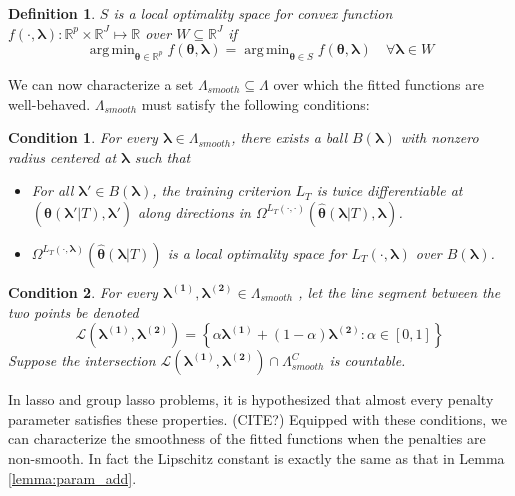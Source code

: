 \documentclass[12pt]{article}
\newtheorem{definition}{Definition}
\newtheorem{condition}{Condition}
\DeclareMathOperator*{\argmin}{arg\,min}
\begin{document}
\begin{definition}
	$S$ is a local optimality space for convex function $f(\cdot, \boldsymbol \lambda): \mathbb{R}^p \times \mathbb{R}^J \mapsto \mathbb{R}$ over $W \subseteq \mathbb{R}^J$ if
	\begin{equation}
	\argmin_{\boldsymbol{\theta} \in \mathbb{R}^p} f(\boldsymbol{\theta}, \boldsymbol \lambda) =
	\argmin_{\boldsymbol{\theta} \in S} f(\boldsymbol{\theta}, \boldsymbol \lambda) \quad \forall \boldsymbol \lambda \in W
	\end{equation}
\end{definition}

We can now characterize a set $\Lambda_{smooth} \subseteq \Lambda$ over which the fitted functions are well-behaved. $\Lambda_{smooth}$ must satisfy the following conditions:

\begin{condition}
	\label{condn:nonsmooth1}
	For every $\boldsymbol{\lambda} \in \Lambda_{smooth}$, there exists a ball $B(\boldsymbol{\lambda})$ with nonzero radius centered at $\boldsymbol{\lambda}$ such that
	\begin{itemize}
		\item For all $\boldsymbol{\lambda}'\in B(\boldsymbol{\lambda})$, the training criterion $L_{T}$ is twice differentiable at $(\hat{\boldsymbol{\theta}}(\boldsymbol{\lambda}'|T), \boldsymbol{\lambda}')$
		along directions in $\Omega^{L_{T}(\cdot,\cdot)}\left(\hat{\boldsymbol{\theta}}(\boldsymbol{\lambda} | T), \boldsymbol{\lambda}\right)$.
		\item $\Omega^{L_T(\cdot, \boldsymbol{\lambda})} \left (\hat{\boldsymbol \theta}\left(\boldsymbol{\lambda}|T \right) \right)$ is a local optimality space for $L_T\left(\cdot,\boldsymbol{\lambda}\right)$ over $B(\boldsymbol{\lambda})$.
	\end{itemize}
\end{condition}
\begin{condition}
	\label{condn:nonsmooth2}
	For every $\boldsymbol{\lambda^{(1)}},\boldsymbol{\lambda^{(2)}}\in\Lambda_{smooth}$
	, let the line segment between the two points be denoted 
	$$
	\mathcal{L}(\boldsymbol{\lambda^{(1)}},\boldsymbol{\lambda^{(2)}})=\left\{ \alpha\boldsymbol{\lambda^{(1)}}+(1-\alpha)\boldsymbol{\lambda^{(2)}}:\alpha\in[0,1]\right\} 
	$$
	Suppose the intersection $\mathcal{L}(\boldsymbol{\lambda^{(1)}},\boldsymbol{\lambda^{(2)}})\cap\Lambda_{smooth}^{C}$
	is countable.
\end{condition}
In lasso and group lasso problems, it is hypothesized that almost every penalty parameter satisfies these properties. (CITE?) Equipped with these conditions, we can characterize the smoothness of the fitted functions when the penalties are non-smooth. In fact the Lipschitz constant is exactly the same as that in Lemma \ref{lemma:param_add}.
\end{document}
